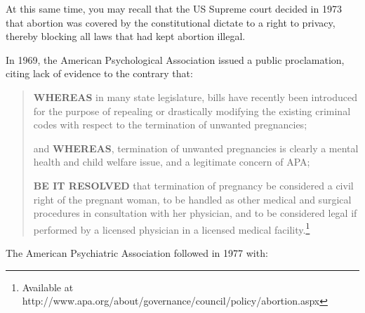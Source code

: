 At this same time, you may recall that the US Supreme court decided in 1973 that abortion was covered by the constitutional dictate to a right to privacy, thereby blocking all laws that had kept abortion illegal.

In 1969, the American Psychological Association issued a public proclamation, citing lack of evidence to the contrary that:

\begin{quote}

\textbf{WHEREAS} in many state legislature, bills have recently been introduced for the purpose of repealing or drastically modifying the existing criminal codes with respect to the termination of unwanted pregnancies;

and \textbf{WHEREAS}, termination of unwanted pregnancies is clearly a mental health and child welfare issue, and a legitimate concern of APA;

\textbf{BE IT RESOLVED} that termination of pregnancy be considered a civil right of the pregnant woman, to be handled as other medical and surgical procedures in consultation with her physician, and to be considered legal if performed by a licensed physician in a licensed medical facility.\footnote{Available at http:\slash \slash www.apa.org\slash about\slash governance\slash council\slash policy\slash abortion.aspx}
\end{quote}

The American Psychiatric Association followed in 1977 with:

